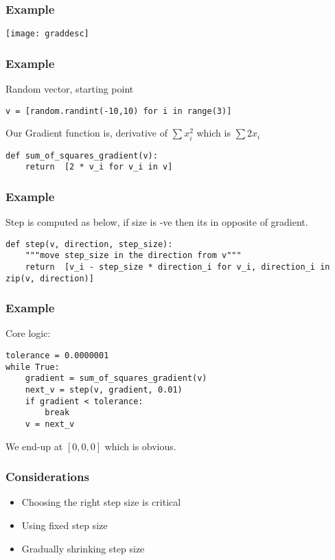 \begin{frame}[fragile]\frametitle{Example}
\begin{center}
\texttt{[image: graddesc]}
\end{center}
\end{frame}

\begin{frame}[fragile]\frametitle{Example}
Random vector, starting point
\begin{lstlisting}
v = [random.randint(-10,10) for	i in range(3)]
\end{lstlisting}
Our Gradient function is, derivative of $\sum x_i ^2$ which is $\sum 2 x_i$
\begin{lstlisting}
def sum_of_squares_gradient(v):
	return	[2 * v_i for v_i in v]
\end{lstlisting}
\end{frame}

\begin{frame}[fragile]\frametitle{Example}
Step is computed as below, if size is -ve then its in opposite of gradient.
\begin{lstlisting}
def step(v, direction, step_size):
	"""move step_size in the direction from v"""
	return	[v_i - step_size * direction_i for v_i, direction_i in zip(v, direction)]
\end{lstlisting}
\end{frame}

\begin{frame}[fragile]\frametitle{Example}
Core logic:
\begin{lstlisting}
tolerance = 0.0000001
while True:
	gradient = sum_of_squares_gradient(v) 
	next_v = step(v, gradient, 0.01) 
	if gradient < tolerance: 
		break
	v = next_v																			
\end{lstlisting}
We end-up at $[0,0,0]$ which is obvious.
\end{frame}

\begin{frame}[fragile]\frametitle{Considerations}
\begin{itemize}
\item Choosing the right step size is critical
\item Using fixed step size
\item Gradually shrinking step size
\end{itemize}
\end{frame}


